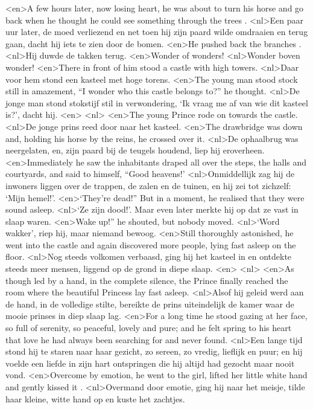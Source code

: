 <en>A few hours later, now losing heart, he was about to turn his horse and go back when he thought he could see something through the trees .
<nl>Een paar uur later,  de moed verliezend en net toen hij zijn paard wilde omdraaien en terug gaan, dacht hij iets te zien door de bomen.
<en>He pushed back the branches .
<nl>Hij duwde de takken terug.
<en>Wonder of wonders!
<nl>Wonder boven wonder!
<en>There in front of him stood a castle with high towers.
<nl>Daar voor hem stond een kasteel met hoge torens.
<en>The young man stood stock still in amazement, “I wonder who this castle belongs to?” he thought.
<nl>De jonge man stond stokstijf stil in verwondering, `Ik vraag me af van wie dit kasteel is?', dacht hij.
<en>
<nl>
<en>The young Prince rode on towards the castle.
<nl>De jonge prins reed door naar het kasteel.
<en>The drawbridge was down and, holding his horse by the reins, he crossed over it.
<nl>De ophaalbrug was neergelaten, en, zijn paard bij de teugels houdend, liep hij eroverheen.
<en>Immediately he saw the inhabitants draped all over the steps, the halls and courtyards, and said to himself, “Good heavens!'
<nl>Onmiddellijk zag hij de inwoners liggen over de trappen, de zalen en de tuinen, en hij zei tot zichzelf: `Mijn hemel!'.
<en>`They’re dead!” But in a moment, he realised that they were sound asleep.
<nl>`Ze zijn dood!'. Maar even later merkte  hij op dat ze vast in slaap waren.  
<en>Wake up!” he shouted, but nobody moved.
<nl>`Word wakker', riep hij, maar niemand bewoog.
<en>Still thoroughly astonished, he went into the castle and again discovered more people, lying fast asleep on the floor.
<nl>Nog steeds volkomen verbaasd, ging hij het kasteel in en ontdekte steeds meer mensen, liggend op de grond in diepe slaap.
<en>
<nl>
<en>As though led by a hand, in the complete silence, the Prince finally reached the room where the beautiful Princess lay fast asleep.
<nl>Alsof hij geleid werd aan de hand, in de volledige stilte, bereikte de prins uiteindelijk de kamer waar de mooie prinses in diep slaap lag.
<en>For a long time he stood gazing at her face, so full of serenity, so peaceful, lovely and pure; and he felt spring to his heart that love he had always been searching for and never found.
<nl>Een lange tijd stond hij te staren naar haar gezicht, zo sereen, zo vredig, lieflijk en puur; en hij voelde een liefde in zijn hart ontspringen die hij altijd had gezocht maar nooit vond. 
<en>Overcome by emotion, he went to the girl, lifted her little white hand and gently kissed it .
<nl>Overmand door emotie, ging hij naar het meisje, tilde haar kleine, witte hand op en kuste het zachtjes.

